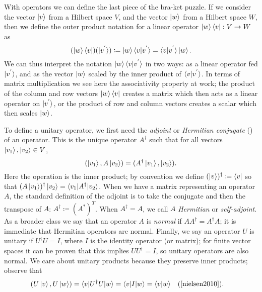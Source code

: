 \documentclass[12pt,twoside]{reedthesis}
\theoremstyle{plain}   %
\theoremstyle{definition}
\theoremstyle{remark}
\numberwithin{equation}{section}
\begin{document}
  With operators we can define the last piece of the bra-ket puzzle. If we consider the vector $\ket{v}$ from a Hilbert space $V$, and the vector $\ket{w}$ from a Hilbert space $W$,
  then we define the outer product notation for a linear operator $\ket{w} \bra{v} : V \to W$ as
  \[ (\ket{w} \bra{v}) (\ket{v^{'}}) \coloneq \ket{w} \braket{v|v^{'}} = \braket{v|v^{'}} \ket{w}.\]
  We can thus interpret the notation $\ket{w} \braket{v|v^{'}}$ in two ways: as a linear operator fed $\ket{v^{'}}$, and as the vector $\ket{w}$ scaled by the inner product of $\braket{v|v^{'}}$.
  In terms of matrix multiplication we see here the associativity property at work; the product of the column and row vectors $\ket{w} \bra{v}$ creates a matrix which then acts as a linear operator on
  $\ket{v^{'}}$, or the product of row and column vectors creates a scalar which then scales $\ket{w}$.
  \par
  To define a unitary operator, we first need the \emph{adjoint} or \emph{Hermitian conjugate} (\cite[2.1.6]{nielsen2010}) of an operator.
  This is the unique operator $A^\dag$ such that for all vectors $\ket{v_1}, \ket{v_2} \in V$,
  \[(\ket{v_1}, A \ket{v_2}) = ( A^\dag \ket{v_1}, \ket{v_2} ).\]
  Here the operation is the inner product; by convention we define $(\ket{v})^\dag \coloneq \bra{v}$ so that $(A \ket{v_1})^\dag \ket{v_2} = \braket{v_1 | A^\dag |v_2 }$.
  When we have a matrix representing an operator $A$, the standard definition of the adjoint is to take the conjugate and then the transpose of $A$: $A^\dag \coloneq (A^*)^T$.
  When $A^\dag = A$, we call $A$ \emph{Hermitian} or \emph{self-adjoint}.
  As a broader class we say that an operator $A$ is \emph{normal} if $AA^\dag = A^\dag A$; it is immediate that Hermitian operators are normal.
  Finally, we say an operator $U$ is unitary if $U^\dag U = I$, where $I$ is the identity operator (or matrix); for finite vector spaces it can be proven that this implies $ U U^\dag = I$, so unitary
  operators are also normal.
  We care about unitary products because they preserve inner products; observe that
  \begin{align*}
    & (U \ket{v}, U \ket{w}) = \braket{v | U^\dag U  | w} = \braket{v | I | w} = \braket{v | w}  & & \text{(\cite[2.36]{nielsen2010}).}
  \end{align*}
\end{document}
